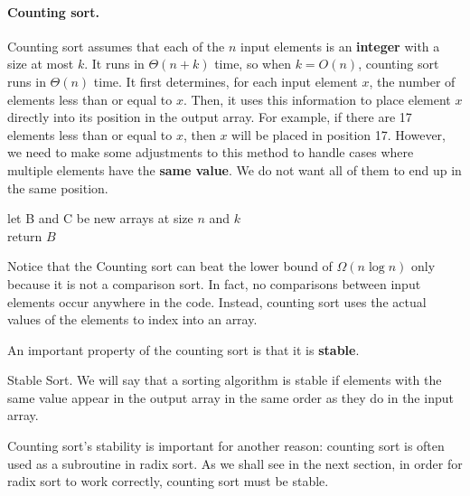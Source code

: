 \paragraph{Counting sort.}
Counting sort assumes that each of the $n$ input elements is an \textbf{integer} with a size at most $k$. It runs in $\Theta(n + k)$ time, so when $k = O(n)$, counting sort runs in $\Theta(n)$ time. It first determines, for each input element $x$, the number of elements less than or equal to $x$. Then, it uses this information to place element $x$ directly into its position in the output array. For example, if there are 17 elements less than or equal to $x$, then $x$ will be placed in position 17. However, we need to make some adjustments to this method to handle cases where multiple elements have the \textbf{same value}. We do not want all of them to end up in the same position.

  \begin{algorithm}
  	let B and C be new arrays at size $n$ and $k$ \\ 
	  return $B$
\caption{Counting-sort$(A, n, k)$}
  \end{algorithm}

Notice that the Counting sort can beat the lower bound of $\Omega\left(n \log n\right)$ only because it is not a comparison sort. In fact, no comparisons between input elements occur anywhere in the code. Instead, counting sort uses the actual values of the elements to index into an array.

An important property of the counting sort is that it is \textbf{stable}.

\begin{defbox}{Stable Sort.}
 We will say that a sorting algorithm is stable if elements with the same value appear in the output array in the same order as they do in the input array. \end{defbox}

Counting sort's stability is important for another reason: counting sort is often used as a subroutine in radix sort. As we shall see in the next section, in order for radix sort to work correctly, counting sort must be stable.


